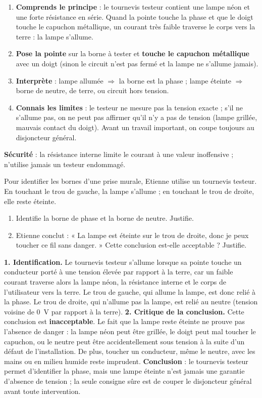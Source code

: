 \documentclass[11pt]{article}
\newcommand{\cle}[1]{{\popxbold\color{popdark}#1}}
\begin{document}
\begin{methode}
\begin{enumerate}
\item \textbf{Comprends le principe} : le tournevis testeur contient une lampe néon et une forte résistance en série. Quand la pointe touche la phase et que le doigt touche le capuchon métallique, un courant très faible traverse le corps vers la terre : la lampe s'allume.
\item \textbf{Pose la pointe} sur la borne à tester et \textbf{touche le capuchon métallique} avec un doigt (sinon le circuit n'est pas fermé et la lampe ne s'allume jamais).
\item \textbf{Interprète} : lampe allumée $\Rightarrow$ la borne est la \cle{phase} ; lampe éteinte $\Rightarrow$ borne de neutre, de terre, ou circuit hors tension.
\item \textbf{Connais les limites} : le testeur ne mesure pas la tension exacte ; s'il ne s'allume pas, on ne peut pas affirmer qu'il n'y a pas de tension (lampe grillée, mauvais contact du doigt). Avant un travail important, on coupe toujours au disjoncteur général.
\end{enumerate}
\textbf{Sécurité} : la résistance interne limite le courant à une valeur inoffensive ; n'utilise jamais un testeur endommagé.
\end{methode}

\begin{exoresolu}
Pour identifier les bornes d'une prise murale, Etienne utilise un tournevis testeur. En touchant le trou de gauche, la lampe s'allume ; en touchant le trou de droite, elle reste éteinte.
\begin{enumerate}
\item Identifie la borne de phase et la borne de neutre. Justifie.
\item Etienne conclut : « La lampe est éteinte sur le trou de droite, donc je peux toucher ce fil sans danger. » Cette conclusion est-elle acceptable ? Justifie.
\end{enumerate}
\tcblower
\textbf{1. Identification.} Le tournevis testeur s'allume lorsque sa pointe touche un conducteur porté à une tension élevée par rapport à la terre, car un faible courant traverse alors la lampe néon, la résistance interne et le corps de l'utilisateur vers la terre. Le trou de gauche, qui allume la lampe, est donc relié à la \cle{phase}. Le trou de droite, qui n'allume pas la lampe, est relié au \cle{neutre} (tension voisine de \SI{0}{V} par rapport à la terre).
\textbf{2. Critique de la conclusion.} Cette conclusion est \textbf{inacceptable}. Le fait que la lampe reste éteinte ne prouve pas l'absence de danger : la lampe néon peut être grillée, le doigt peut mal toucher le capuchon, ou le neutre peut être accidentellement sous tension à la suite d'un défaut de l'installation. De plus, toucher un conducteur, même le neutre, avec les mains ou en milieu humide reste imprudent.
\textbf{Conclusion} : le tournevis testeur permet d'identifier la phase, mais une lampe éteinte n'est jamais une garantie d'absence de tension ; la seule consigne sûre est de couper le disjoncteur général avant toute intervention.
\end{exoresolu}
\end{document}
